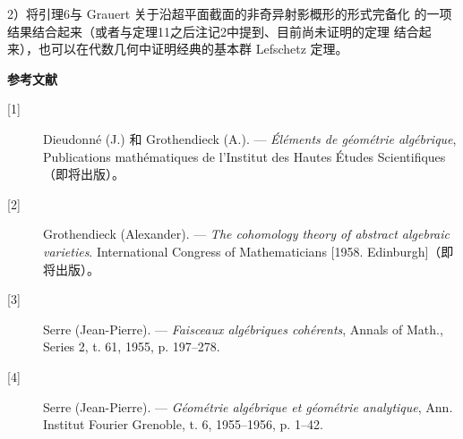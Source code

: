 2）将引理6与 Grauert 关于沿超平面截面的非奇异射影概形的形式完备化
的一项结果结合起来（或者与定理11之后注记2中提到、目前尚未证明的定理
结合起来），也可以在代数几何中证明经典的基本群 Lefschetz
定理。

\begin{center}
  \textbf{参考文献}
\end{center}

\begin{description}
  \item[{[1]}] Dieudonné (J.) 和 Grothendieck (A.). --- \emph{Éléments de
    géométrie algébrique}, Publications mathématiques de l'Institut des Hautes
    Études Scientifiques（即将出版）。
  \item[{[2]}] Grothendieck (Alexander). --- \emph{The cohomology theory of
    abstract algebraic varieties}. International Congress of Mathematicians
    [1958. Edinburgh]（即将出版）。
  \item[{[3]}] Serre (Jean-Pierre). --- \emph{Faisceaux algébriques
    cohérents}, Annals of Math., Series 2, t. 61, 1955, p. 197--278.
  \item[{[4]}] Serre (Jean-Pierre). --- \emph{Géométrie algébrique et
    géométrie analytique}, Ann. Institut Fourier Grenoble, t. 6, 1955--1956,
    p. 1--42.
\end{description}
